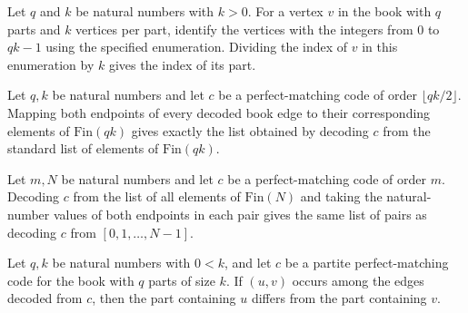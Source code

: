 \begin{theorem}
\label{FABL.bookVertexFinEquiv_val_div}
\leanok
{}
Let $q$ and $k$ be natural numbers with $k>0$. For a vertex $v$ in the book with $q$
parts and $k$ vertices per part, identify the vertices with the integers from $0$ to
$qk-1$ using the specified enumeration. Dividing the index of $v$ in this enumeration by
$k$ gives the index of its part.
\end{theorem}

\begin{theorem}
\label{FABL.decodedBookPartiteEdges_map_fin}
\leanok
{}
Let $q,k$ be natural numbers and let $c$ be a perfect-matching code of order $\lfloor
qk/2\rfloor$. Mapping both endpoints of every decoded book edge to their corresponding
elements of $\mathrm{Fin}(qk)$ gives exactly the list obtained by decoding $c$ from the
standard list of elements of $\mathrm{Fin}(qk)$.
\end{theorem}

\begin{theorem}
\label{FABL.decode_finVertexList_map_val}
\leanok
{}
Let $m,N$ be natural numbers and let $c$ be a perfect-matching code of order $m$.
Decoding $c$ from the list of all elements of $\mathrm{Fin}(N)$ and taking the
natural-number values of both endpoints in each pair gives the same list of pairs as
decoding $c$ from $[0,1,\ldots,N-1]$.
\end{theorem}

\begin{theorem}
\label{FABL.decodedBookPartiteEdge_parts_ne}
\leanok
{}
Let $q,k$ be natural numbers with $0<k$, and let $c$ be a partite perfect-matching code
for the book with $q$ parts of size $k$. If $(u,v)$ occurs among the edges decoded from
$c$, then the part containing $u$ differs from the part containing $v$.
\end{theorem}

